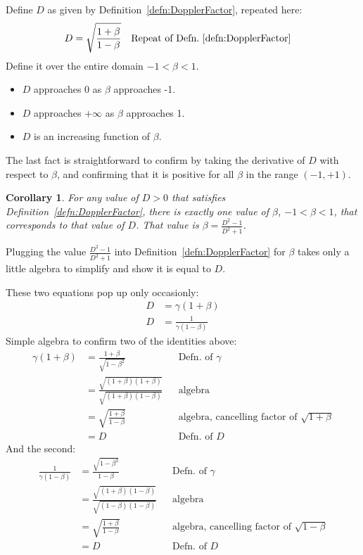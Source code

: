 \documentclass[a4paper]{article}
\theoremstyle{plain}
\newtheorem{corollary}[theorem]{Corollary}
\theoremstyle{definition}
\begin{document}
Define $D$ as given by Definition~\eqref{defn:DopplerFactor}, repeated
here:
\begin{align*}
D & = \sqrt{ \frac{1 + \beta}{1 - \beta} } & & \text{Repeat of Defn.~\eqref{defn:DopplerFactor}}
\end{align*}
Define it over the entire domain $-1 < \beta < 1$.
\begin{itemize}
\item $D$ approaches 0 as $\beta$ approaches -1.
\item $D$ approaches $+\infty$ as $\beta$ approaches 1.
\item $D$ is an increasing function of $\beta$.
\end{itemize}
The last fact is straightforward to confirm by taking the derivative
of $D$ with respect to $\beta$, and confirming that it is positive
for all $\beta$ in the range $(-1, +1)$.

\begin{corollary}
\label{cor:DdeterminesBeta}
For any value of $D > 0$ that satisfies
Definition~\eqref{defn:DopplerFactor}, there is exactly one value of
$\beta$, $-1 < \beta < 1$,
that corresponds to that value of $D$.
That value is $\beta = \frac{D^2-1}{D^2+1}$.
\end{corollary}
Plugging the value $\frac{D^2-1}{D^2+1}$ into
Definition~\eqref{defn:DopplerFactor} for $\beta$ takes only a little
algebra to simplify and show it is equal to $D$.

These two equations pop up only occasionly:
\begin{align}
D & = \gamma (1+\beta) \label{eqn:Dgammabeta1} \\
D & = \frac{1}{\gamma (1-\beta)} \label{eqn:Dgammabeta2}
\end{align}
Simple algebra to confirm two of the identities above:
\begin{align*}
\gamma (1+\beta)
  & = \frac{1+\beta}{\sqrt{1-\beta^2}} & & \text{Defn. of $\gamma$} \\
  & = \frac{\sqrt{(1+\beta)(1+\beta)}}{\sqrt{(1+\beta)(1-\beta)}} & & \text{algebra} \\
  & = \sqrt{ \frac{1+\beta}{1-\beta} } & & \text{algebra, cancelling factor of $\sqrt{1+\beta}$} \\
  & = D & & \text{Defn. of $D$}
\end{align*}
And the second:
\begin{align*}
\frac{1}{\gamma (1-\beta)}
  & = \frac{\sqrt{1-\beta^2}}{1-\beta} & & \text{Defn. of $\gamma$} \\
  & = \frac{\sqrt{(1+\beta)(1-\beta)}}{\sqrt{(1-\beta)(1-\beta)}} & & \text{algebra} \\
  & = \sqrt{ \frac{1+\beta}{1-\beta} } & & \text{algebra, cancelling factor of $\sqrt{1-\beta}$} \\
  & = D & & \text{Defn. of $D$}
\end{align*}
\end{document}

